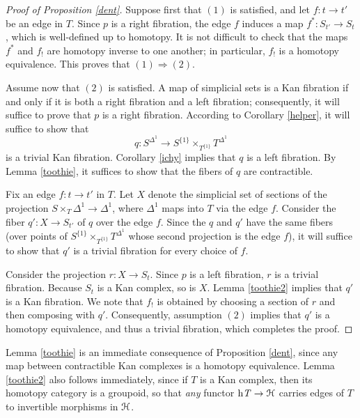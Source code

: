 \begin{proof}[Proof of Proposition \ref{dent}]
Suppose first that $(1)$ is satisfied, and let $f: t \rightarrow t'$ be an edge in $T$. 
Since $p$ is a right fibration, the edge $f$ induces a map $f^{\ast}: S_{t'} \rightarrow S_{t}$, which is
well-defined up to homotopy. It is not difficult to check that the maps $f^{\ast}$ and
$f_{!}$ are homotopy inverse to one another; in particular, $f_{!}$ is a homotopy equivalence.
This proves that $(1) \Rightarrow (2)$.

Assume now that $(2)$ is satisfied. A map of simplicial sets is a Kan fibration if and only if it is both a right fibration and a left fibration; consequently, it will suffice to prove that $p$ is a right fibration. According to Corollary \ref{helper}, it will suffice to show that $$q: S^{\Delta^1} \rightarrow S^{ \{1\} } \times_{ T^{ \{1\} }} T^{ \Delta^1} $$ is a trivial Kan fibration. Corollary \ref{ichy} implies that $q$ is a left fibration. By Lemma \ref{toothie}, it suffices to show that the fibers of $q$ are contractible.

Fix an edge $f: t \rightarrow t'$ in $T$. Let $X$ denote the simplicial set of sections of the projection
$S \times_{ T} {\Delta^1} \rightarrow \Delta^1$, where $\Delta^1$ maps into $T$ via the edge $f$. Consider the fiber $q': X \rightarrow S_{ t'}$ of $q$ over the edge $f$. Since the $q$ and $q'$ have the same fibers (over points of $S^{ \{1\} }\times_{ T^{ \{1\} } } T^{ \Delta^1} $ whose second projection is the edge $f$), it will suffice to show that $q'$ is a trivial fibration for every choice of $f$.

Consider the projection $r: X \rightarrow S_{t}$. Since $p$ is a left fibration, $r$ is a trivial fibration.
Because $S_{t}$ is a Kan complex, so is $X$. Lemma \ref{toothie2} implies that $q'$ is a Kan fibration.
We note that $f_{!}$ is obtained by choosing a section of $r$ and then composing with $q'$. Consequently, assumption $(2)$ implies that $q'$ is a homotopy equivalence, and thus a trivial fibration, which completes the proof.
\end{proof}

\begin{remark}
Lemma \ref{toothie} is an immediate consequence of Proposition \ref{dent}, since any map between contractible Kan complexes is a homotopy equivalence. Lemma \ref{toothie2} also follows immediately, since if $T$ is a Kan complex, then its homotopy category is a groupoid, so that
{\em any} functor $\rm{h} \it{T} \rightarrow \operatorname{\mathcal{H}}$ carries edges of $T$ to invertible morphisms in $\operatorname{\mathcal{H}}$.
\end{remark}

